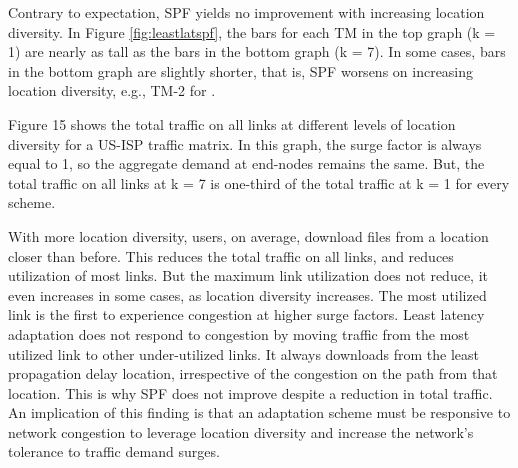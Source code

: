 Contrary to expectation, SPF yields no improvement with increasing location diversity.
In Figure \ref{fig:leastlatspf}, the bars for each TM in the top graph (k = 1) are nearly as  tall as the bars in the bottom graph (k = 7). 
In some cases, bars in the bottom graph are slightly shorter, that is, SPF worsens on increasing location diversity, e.g.,  TM-2 for \opt.


Figure 15 shows the total traffic on all links at different levels of location diversity for a US-ISP  traffic matrix. In this graph, the surge factor is always equal to 1, so the aggregate demand at end-nodes remains the same. But, the total traffic on all links at k = 7 is one-third of the total traffic at k = 1 for every scheme.


With more location diversity, users, on average, download files from a location closer than before.
This reduces the total traffic on all links, and reduces utilization of most links.
But the maximum link utilization does not reduce, it even increases in some cases, as location diversity increases. 
The most utilized link is the first to experience congestion at higher surge factors.
Least latency adaptation does not respond to congestion by moving traffic from the most utilized link to other under-utilized links.
It always downloads from the least propagation delay location, irrespective of the congestion on the path from that location.
This is why SPF does not improve despite a reduction in total traffic. 
An implication of this finding is that an adaptation scheme must be responsive to network congestion to leverage location diversity and increase the network's tolerance to traffic demand surges.






